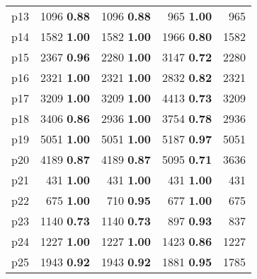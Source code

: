 \begin{tabular}{lrrrr}
\multicolumn{1}{l|}{p13} & {\footnotesize 1096} \textbf{0.88} & {\footnotesize 1096} \textbf{0.88} & {\footnotesize 965} \textbf{1.00} & \multicolumn{1}{|r}{965}\\
\multicolumn{1}{l|}{p14} & {\footnotesize 1582} \textbf{1.00} & {\footnotesize 1582} \textbf{1.00} & {\footnotesize 1966} \textbf{0.80} & \multicolumn{1}{|r}{1582}\\
\multicolumn{1}{l|}{p15} & {\footnotesize 2367} \textbf{0.96} & {\footnotesize 2280} \textbf{1.00} & {\footnotesize 3147} \textbf{0.72} & \multicolumn{1}{|r}{2280}\\
\multicolumn{1}{l|}{p16} & {\footnotesize 2321} \textbf{1.00} & {\footnotesize 2321} \textbf{1.00} & {\footnotesize 2832} \textbf{0.82} & \multicolumn{1}{|r}{2321}\\
\multicolumn{1}{l|}{p17} & {\footnotesize 3209} \textbf{1.00} & {\footnotesize 3209} \textbf{1.00} & {\footnotesize 4413} \textbf{0.73} & \multicolumn{1}{|r}{3209}\\
\multicolumn{1}{l|}{p18} & {\footnotesize 3406} \textbf{0.86} & {\footnotesize 2936} \textbf{1.00} & {\footnotesize 3754} \textbf{0.78} & \multicolumn{1}{|r}{2936}\\
\multicolumn{1}{l|}{p19} & {\footnotesize 5051} \textbf{1.00} & {\footnotesize 5051} \textbf{1.00} & {\footnotesize 5187} \textbf{0.97} & \multicolumn{1}{|r}{5051}\\
\multicolumn{1}{l|}{p20} & {\footnotesize 4189} \textbf{0.87} & {\footnotesize 4189} \textbf{0.87} & {\footnotesize 5095} \textbf{0.71} & \multicolumn{1}{|r}{3636}\\
\multicolumn{1}{l|}{p21} & {\footnotesize 431} \textbf{1.00} & {\footnotesize 431} \textbf{1.00} & {\footnotesize 431} \textbf{1.00} & \multicolumn{1}{|r}{431}\\
\multicolumn{1}{l|}{p22} & {\footnotesize 675} \textbf{1.00} & {\footnotesize 710} \textbf{0.95} & {\footnotesize 677} \textbf{1.00} & \multicolumn{1}{|r}{675}\\
\multicolumn{1}{l|}{p23} & {\footnotesize 1140} \textbf{0.73} & {\footnotesize 1140} \textbf{0.73} & {\footnotesize 897} \textbf{0.93} & \multicolumn{1}{|r}{837}\\
\multicolumn{1}{l|}{p24} & {\footnotesize 1227} \textbf{1.00} & {\footnotesize 1227} \textbf{1.00} & {\footnotesize 1423} \textbf{0.86} & \multicolumn{1}{|r}{1227}\\
\multicolumn{1}{l|}{p25} & {\footnotesize 1943} \textbf{0.92} & {\footnotesize 1943} \textbf{0.92} & {\footnotesize 1881} \textbf{0.95} & \multicolumn{1}{|r}{1785}\\

\end{tabular}
